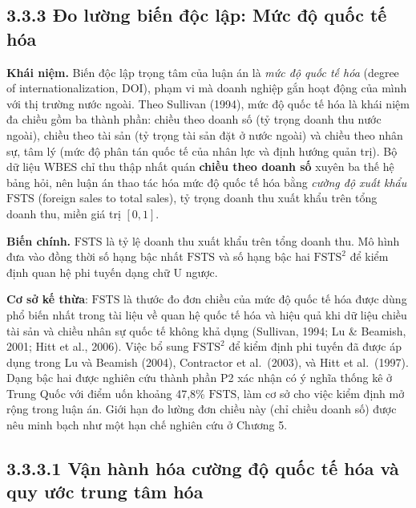 \documentclass[
  a4paper,
  13pt]{extreport}
\begin{document}
\hypertarget{ux111o-lux1b0ux1eddng-biux1ebfn-ux111ux1ed9c-lux1eadp-mux1ee9c-ux111ux1ed9-quux1ed1c-tux1ebf-huxf3a}{%
\subsection{3.3.3 Đo lường biến độc lập: Mức độ quốc tế
hóa}\label{ux111o-lux1b0ux1eddng-biux1ebfn-ux111ux1ed9c-lux1eadp-mux1ee9c-ux111ux1ed9-quux1ed1c-tux1ebf-huxf3a}}

\textbf{Khái niệm.} Biến độc lập trọng tâm của luận án là \emph{mức độ
quốc tế hóa} (degree of internationalization, DOI), phạm vi mà doanh
nghiệp gắn hoạt động của mình với thị trường nước ngoài. Theo Sullivan
(1994), mức độ quốc tế hóa là khái niệm đa chiều gồm ba thành phần:
chiều theo doanh số (tỷ trọng doanh thu nước ngoài), chiều theo tài sản
(tỷ trọng tài sản đặt ở nước ngoài) và chiều theo nhân sự, tâm lý (mức
độ phân tán quốc tế của nhân lực và định hướng quản trị). Bộ dữ liệu
WBES chỉ thu thập nhất quán \textbf{chiều theo doanh số} xuyên ba thế hệ
bảng hỏi, nên luận án thao tác hóa mức độ quốc tế hóa bằng \emph{cường
độ xuất khẩu} \(\mathrm{FSTS}\) (foreign sales to total sales), tỷ trọng
doanh thu xuất khẩu trên tổng doanh thu, miền giá trị \([0,1]\).

\textbf{Biến chính.} \(\mathrm{FSTS}\) là tỷ lệ doanh thu xuất khẩu trên
tổng doanh thu. Mô hình đưa vào đồng thời số hạng bậc nhất
\(\mathrm{FSTS}\) và số hạng bậc hai \(\mathrm{FSTS}^{2}\) để kiểm định
quan hệ phi tuyến dạng chữ U ngược.

\textbf{Cơ sở kế thừa}: \(\mathrm{FSTS}\) là thước đo đơn chiều của mức
độ quốc tế hóa được dùng phổ biến nhất trong tài liệu về quan hệ quốc tế
hóa và hiệu quả khi dữ liệu chiều tài sản và chiều nhân sự quốc tế không
khả dụng (Sullivan, 1994; Lu \& Beamish, 2001; Hitt et al., 2006). Việc
bổ sung \(\mathrm{FSTS}^{2}\) để kiểm định phi tuyến đã được áp dụng
trong Lu và Beamish (2004), Contractor et al.~(2003), và Hitt et
al.~(1997). Dạng bậc hai được nghiên cứu thành phần P2 xác nhận có ý
nghĩa thống kê ở Trung Quốc với điểm uốn khoảng 47,8\%
\(\mathrm{FSTS}\), làm cơ sở cho việc kiểm định mở rộng trong luận án.
Giới hạn đo lường đơn chiều này (chỉ chiều doanh số) được nêu minh bạch
như một hạn chế nghiên cứu ở Chương 5.

\hypertarget{vux1eadn-huxe0nh-huxf3a-cux1b0ux1eddng-ux111ux1ed9-quux1ed1c-tux1ebf-huxf3a-vuxe0-quy-ux1b0ux1edbc-trung-tuxe2m-huxf3a}{%
\subsection{3.3.3.1 Vận hành hóa cường độ quốc tế hóa và quy ước trung
tâm
hóa}\label{vux1eadn-huxe0nh-huxf3a-cux1b0ux1eddng-ux111ux1ed9-quux1ed1c-tux1ebf-huxf3a-vuxe0-quy-ux1b0ux1edbc-trung-tuxe2m-huxf3a}}
\end{document}
